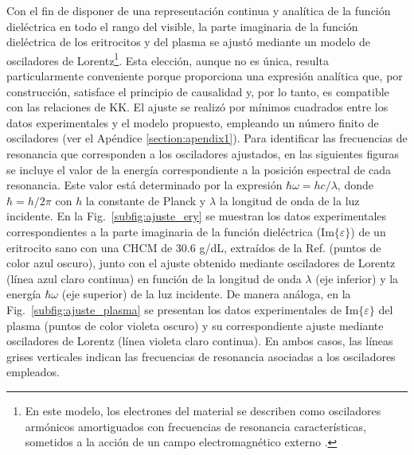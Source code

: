 Con el fin de disponer de una representación continua y analítica de la función dieléctrica en todo el rango del visible, la parte imaginaria de la función dieléctrica de los eritrocitos y del plasma se ajustó mediante un modelo de osciladores de Lorentz\footnote{En este modelo, los electrones del material se describen como osciladores armónicos amortiguados con frecuencias de resonancia características, sometidos a la acción de un campo electromagnético externo \cite{bohrenAbsorptionScatteringLight2008}.}. Esta elección, aunque no es única, resulta particularmente conveniente porque proporciona una expresión analítica que, por construcción, satisface el principio de causalidad \cite{maggioreModernIntroductionClassical2023} y, por lo tanto, es compatible con las relaciones de KK. El ajuste se realizó por mínimos cuadrados entre los datos experimentales y el modelo propuesto, empleando un número finito de osciladores (ver el Apéndice \ref{section:apendix1}). Para identificar las frecuencias de resonancia que corresponden a los osciladores ajustados, en las siguientes figuras se incluye el valor de la energía correspondiente a la posición espectral de cada resonancia. Este valor está determinado por la expresión $\hbar\omega=hc/\lambda$, donde $\hbar=h/2\pi$ con $h$ la constante de Planck y $\lambda$ la longitud de onda de la luz incidente. En la Fig.~\ref{subfig:ajuste_ery} se muestran los datos experimentales correspondientes a la parte imaginaria de la función dieléctrica ($\text{Im}\{\varepsilon\}$) de un eritrocito sano con una CHCM de 30.6 g/dL, extraídos de la Ref. \cite{friebelDeterminationComplexRefractive2005} (puntos de color azul oscuro), junto con el ajuste obtenido mediante osciladores de Lorentz (línea azul claro continua) en función de la longitud de onda $\lambda$ (eje inferior) y la energía $\hbar\omega$ (eje superior) de la luz incidente. De manera análoga, en la Fig.~\ref{subfig:ajuste_plasma} se presentan los datos experimentales de $\text{Im}\{\varepsilon\}$ del plasma (puntos de color violeta oscuro) y su correspondiente ajuste mediante osciladores de Lorentz (línea violeta claro continua). En ambos casos, las líneas grises verticales indican las frecuencias de resonancia asociadas a los osciladores empleados.
%
